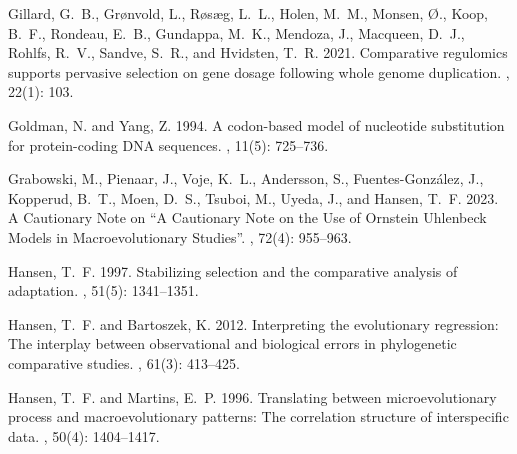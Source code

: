 \documentclass{article}
\begin{document}
\begin{thebibliography}{}
    Gillard, G.~B., Gr{\o}nvold, L., R{\o}s{\ae}g, L.~L., Holen, M.~M., Monsen,
        {\O}., Koop, B.~F., Rondeau, E.~B., Gundappa, M.~K., Mendoza, J., Macqueen,
    D.~J., Rohlfs, R.~V., Sandve, S.~R., and Hvidsten, T.~R. 2021.
    \newblock Comparative regulomics supports pervasive selection on gene dosage
    following whole genome duplication.
    , {22}(1): 103.

    Goldman, N. and Yang, Z. 1994.
    \newblock A codon-based model of nucleotide substitution for protein-coding
        {{DNA}} sequences.
    , {11}(5): 725--736.

    Grabowski, M., Pienaar, J., Voje, K.~L., Andersson, S., {Fuentes-Gonz{\'a}lez},
    J., Kopperud, B.~T., Moen, D.~S., Tsuboi, M., Uyeda, J., and Hansen, T.~F.
    2023.
    \newblock A {{Cautionary Note}} on ``{{A Cautionary Note}} on the {{Use}} of
        {{Ornstein Uhlenbeck Models}} in {{Macroevolutionary Studies}}''.
    , {72}(4): 955--963.

    Hansen, T.~F. 1997.
    \newblock Stabilizing selection and the comparative analysis of adaptation.
    , {51}(5): 1341--1351.

    Hansen, T.~F. and Bartoszek, K. 2012.
    \newblock Interpreting the evolutionary regression: The interplay between
    observational and biological errors in phylogenetic comparative studies.
    , {61}(3): 413--425.

    Hansen, T.~F. and Martins, E.~P. 1996.
    \newblock Translating between microevolutionary process and macroevolutionary
    patterns: The correlation structure of interspecific data.
    , {50}(4): 1404--1417.


\end{thebibliography}
\end{document}
